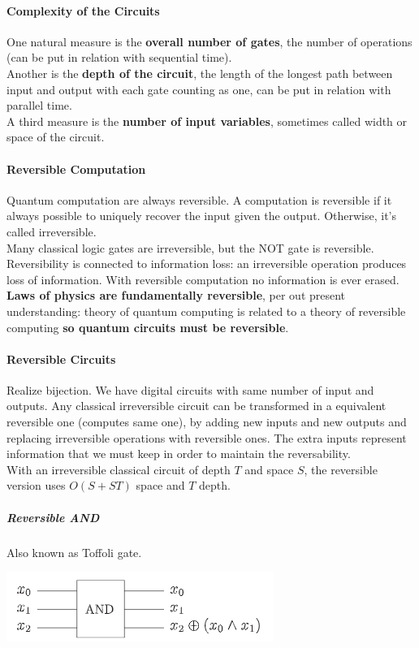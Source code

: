 \documentclass[10pt]{report}
\begin{document}
\paragraph{Complexity of the Circuits} One natural measure is the \textbf{overall number of gates}, the number of operations (can be put in relation with sequential time).\\
Another is the \textbf{depth of the circuit}, the length of the longest path between input and output with each gate counting as one, can be put in relation with parallel time.\\
A third measure is the \textbf{number of input variables}, sometimes called width or space of the circuit.
\paragraph{Reversible Computation} Quantum computation are always reversible. A computation is reversible if it always possible to uniquely recover the input given the output. Otherwise, it's called irreversible.\\
Many classical logic gates are irreversible, but the NOT gate is reversible.\\
Reversibility is connected to information loss: an irreversible operation produces loss of information. With reversible computation no information is ever erased.\\
\textbf{Laws of physics are fundamentally reversible}, per out present understanding: theory of quantum computing is related to a theory of reversible computing \textbf{so quantum circuits must be reversible}.
\paragraph{Reversible Circuits} Realize bijection. We have digital circuits with same number of input and outputs. Any classical irreversible circuit can be transformed in a equivalent reversible one (computes same one), by adding new inputs and new outputs and replacing irreversible operations with reversible ones. The extra inputs represent information that we must keep in order to maintain the reversability.\\
With an irreversible classical circuit of depth $T$ and space $S$, the reversible version uses $O(S+ST)$ space and $T$ depth.
\subparagraph{Reversible AND} Also known as Toffoli gate.
\begin{center}
	\includegraphics[scale=0.5]{10.png}
\end{center}
\end{document}
